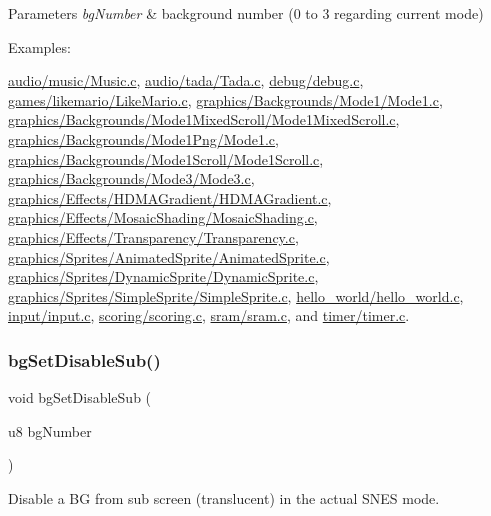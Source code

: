 \begin{DoxyParams}{Parameters}
{\em bg\+Number} & background number (0 to 3 regarding current mode) \\
\hline
\end{DoxyParams}
\begin{Desc}
\item[Examples\+: ]\par
\hyperlink{a00392}{audio/music/\+Music.\+c}, \hyperlink{a00394}{audio/tada/\+Tada.\+c}, \hyperlink{a00396}{debug/debug.\+c}, \hyperlink{a00390}{games/likemario/\+Like\+Mario.\+c}, \hyperlink{a00362}{graphics/\+Backgrounds/\+Mode1/\+Mode1.\+c}, \hyperlink{a00368}{graphics/\+Backgrounds/\+Mode1\+Mixed\+Scroll/\+Mode1\+Mixed\+Scroll.\+c}, \hyperlink{a00364}{graphics/\+Backgrounds/\+Mode1\+Png/\+Mode1.\+c}, \hyperlink{a00366}{graphics/\+Backgrounds/\+Mode1\+Scroll/\+Mode1\+Scroll.\+c}, \hyperlink{a00370}{graphics/\+Backgrounds/\+Mode3/\+Mode3.\+c}, \hyperlink{a00374}{graphics/\+Effects/\+H\+D\+M\+A\+Gradient/\+H\+D\+M\+A\+Gradient.\+c}, \hyperlink{a00376}{graphics/\+Effects/\+Mosaic\+Shading/\+Mosaic\+Shading.\+c}, \hyperlink{a00378}{graphics/\+Effects/\+Transparency/\+Transparency.\+c}, \hyperlink{a00382}{graphics/\+Sprites/\+Animated\+Sprite/\+Animated\+Sprite.\+c}, \hyperlink{a00384}{graphics/\+Sprites/\+Dynamic\+Sprite/\+Dynamic\+Sprite.\+c}, \hyperlink{a00380}{graphics/\+Sprites/\+Simple\+Sprite/\+Simple\+Sprite.\+c}, \hyperlink{a00358}{hello\+\_\+world/hello\+\_\+world.\+c}, \hyperlink{a00386}{input/input.\+c}, \hyperlink{a00400}{scoring/scoring.\+c}, \hyperlink{a00398}{sram/sram.\+c}, and \hyperlink{a00388}{timer/timer.\+c}.\end{Desc}
\mbox{\label{a00287_af28e4200f4e49073dcb8f950099bb9c3}} 
\subsubsection{\texorpdfstring{bg\+Set\+Disable\+Sub()}{bgSetDisableSub()}}
{\footnotesize\ttfamily void bg\+Set\+Disable\+Sub (\begin{DoxyParamCaption}\item[{u8}]{bg\+Number }\end{DoxyParamCaption})}



Disable a BG from sub screen (translucent) in the actual S\+N\+ES mode. 


